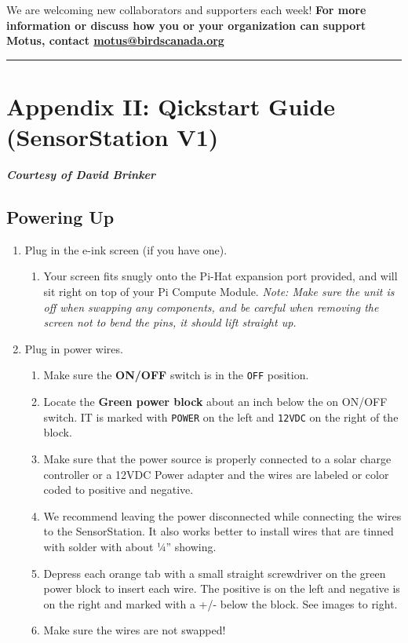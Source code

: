 \documentclass[
]{article}
\providecommand{\tightlist}{%
  \setlength{\itemsep}{0pt}\setlength{\parskip}{0pt}}
\begin{document}
We are welcoming new collaborators and supporters each week! \textbf{For
more information or discuss how you or your organization can support
Motus, contact \url{motus@birdscanada.org}}

\begin{center}\rule{0.5\linewidth}{0.5pt}\end{center}

\hypertarget{V1Quickstart}{%
\section{Appendix II: Qickstart Guide (SensorStation
V1)}\label{V1Quickstart}}

\textbf{\emph{Courtesy of David Brinker}}

\hypertarget{powering-up}{%
\subsection{Powering Up}\label{powering-up}}

\begin{enumerate}
\def\labelenumi{\arabic{enumi}.}
\tightlist
\item
  Plug in the e-ink screen (if you have one).

  \begin{enumerate}
  \def\labelenumii{\alph{enumii}.}
  \tightlist
  \item
    Your screen fits snugly onto the Pi-Hat expansion port provided, and
    will sit right on top of your Pi Compute Module. \emph{Note: Make
    sure the unit is off when swapping any components, and be careful
    when removing the screen not to bend the pins, it should lift
    straight up.}
  \end{enumerate}
\item
  Plug in power wires.

  \begin{enumerate}
  \def\labelenumii{\alph{enumii}.}
  \tightlist
  \item
    Make sure the \textbf{ON/OFF} switch is in the \texttt{OFF}
    position.
  \item
    Locate the \textbf{Green power block} about an inch below the on
    ON/OFF switch. IT is marked with \texttt{POWER} on the left and
    \texttt{12VDC} on the right of the block.
  \item
    Make sure that the power source is properly connected to a solar
    charge controller or a 12VDC Power adapter and the wires are labeled
    or color coded to positive and negative.
  \item
    We recommend leaving the power disconnected while connecting the
    wires to the SensorStation. It also works better to install wires
    that are tinned with solder with about ¼'' showing.
  \item
    Depress each orange tab with a small straight screwdriver on the
    green power block to insert each wire. The positive is on the left
    and negative is on the right and marked with a +/- below the block.
    See images to right.
  \item
    Make sure the wires are not swapped!
  \end{enumerate}
\end{enumerate}
\end{document}
